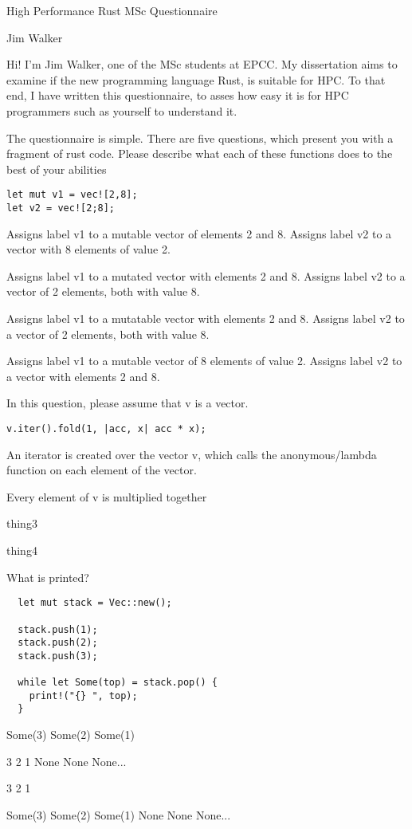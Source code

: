 \documentclass[11pt]{article} %
\newcommand*\choice{\item}
\begin{document}
\author{Jim Walker}
\begin{center}
\large {High Performance Rust MSc Questionnaire}

\normalsize Jim Walker
\end{center}

Hi! I'm Jim Walker, one of the MSc students at EPCC. My dissertation aims to examine if the new programming language Rust, is suitable for HPC. To that end, I have written this questionnaire, to asses how easy it is for HPC programmers such as yourself to understand it.

The questionnaire is simple. There are five questions, which present you with a fragment of rust code. Please describe what each of these functions does to the best of your abilities


\begin{multiplechoice}[choices=1]

\begin{lstlisting}
let mut v1 = vec![2,8];
let v2 = vec![2;8];
\end{lstlisting}

\choice Assigns label v1 to a mutable vector of elements 2 and 8. Assigns label v2 to a vector with 8 elements of value 2.
\choice Assigns label v1 to a mutated vector with elements 2 and 8. Assigns label v2 to a vector of 2 elements, both with value 8.
\choice Assigns label v1 to a mutatable vector with elements 2 and 8. Assigns label v2 to a vector of 2 elements, both with value 8.
\choice Assigns label v1 to a mutable vector of 8 elements of value 2. Assigns label v2 to a vector with elements 2 and 8.

\end{multiplechoice}


\begin{multiplechoice}[choices=1]
In this question, please assume that v is a vector.
\begin{lstlisting}
v.iter().fold(1, |acc, x| acc * x);
\end{lstlisting}
  \choice An iterator is created over the vector v, which calls the anonymous/lambda function on each element of the vector.
  \choice Every element of v is multiplied together
  \choice thing3
  \choice thing4
\end{multiplechoice}

\begin{multiplechoice}[choices=1]
What is printed?
\begin{lstlisting}
  let mut stack = Vec::new();

  stack.push(1);
  stack.push(2);
  stack.push(3);

  while let Some(top) = stack.pop() {
    print!("{} ", top);
  }
\end{lstlisting}
  \choice Some(3) Some(2) Some(1)
  \choice 3 2 1 None None None...
  \choice 3 2 1
  \choice Some(3) Some(2) Some(1) None None None...
\end{multiplechoice}
\end{document}
